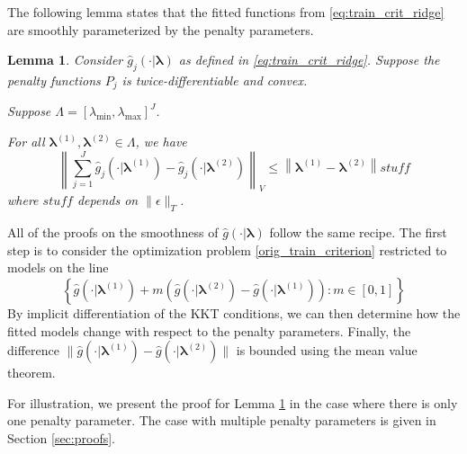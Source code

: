 \documentclass[12pt]{article}
\newtheorem{lemma}{Lemma}
\begin{document}
The following lemma states that the fitted functions from \ref{eq:train_crit_ridge} are smoothly parameterized by the penalty parameters.

\begin{lemma}
\label{lemma:nonparam_smooth}
Consider $\hat{g}_{j}(\cdot| \boldsymbol \lambda)$ as defined in \ref{eq:train_crit_ridge}.
Suppose the penalty functions $P_{j}$ is twice-differentiable and convex.

Suppose $\Lambda = [\lambda_{\min}, \lambda_{\max}]^J$.

For all $\boldsymbol \lambda^{(1)}, \boldsymbol \lambda^{(2)} \in \Lambda$, we have
\[
\left \|
\sum_{j=1}^{J}\hat{g}_{j}(\cdot| \boldsymbol \lambda^{(1)})-\hat{g}_{j}(\cdot| \boldsymbol \lambda^{(2)})
\right \|_{V}
\le
\left \|
\boldsymbol \lambda^{(1)}- \boldsymbol \lambda^{(2)}
\right \|
stuff
\]
where $stuff$ depends on $\| \epsilon \|_T$.
\end{lemma}

All of the proofs on the smoothness of $\hat{g}(\cdot | \boldsymbol \lambda)$ follow the same recipe. The first step is to consider the optimization problem \eqref{orig_train_criterion} restricted to models on the line
\begin{equation}
\left \{ \hat{g}(\cdot |\boldsymbol \lambda^{(1)}) + m \left (\hat{g}(\cdot |\boldsymbol \lambda^{(2)})  - \hat{g}(\cdot |\boldsymbol \lambda^{(1)}) \right ) : m \in [0,1] \right \}
\end{equation}
By implicit differentiation of the KKT conditions, we can then determine how the fitted models change with respect to the penalty parameters. Finally, the difference $\| \hat{g}(\cdot | \boldsymbol \lambda^{(1)}) -  \hat{g}(\cdot | \boldsymbol \lambda^{(2)}) \|$ is bounded using the mean value theorem.

For illustration, we present the proof for Lemma \ref{lemma:nonparam_smooth} in the case where there is only one penalty parameter. The case with multiple penalty parameters is given in Section \ref{sec:proofs}.
\end{document}
